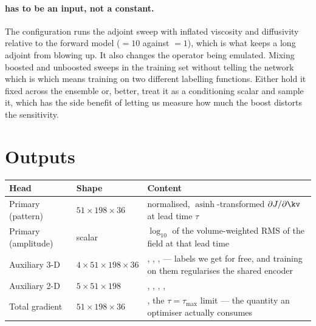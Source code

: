 \paragraph{ has to be an input, not a constant.}
The  configuration runs the adjoint sweep with inflated
viscosity and diffusivity relative to the forward model
(${}=10$ against ${}=1$), which is what
keeps a long adjoint from blowing up. It also changes the operator being
emulated. Mixing boosted and unboosted sweeps in the training set without
telling the network which is which means training on two different labelling
functions. Either hold it fixed across the ensemble or, better, treat it as a
conditioning scalar and sample it, which has the side benefit of letting us
measure how much the boost distorts the sensitivity.

\section{Outputs}

\begin{center}
\begin{tabularx}{\textwidth}{@{}Y{0.65}Y{0.7}Y{1.65}@{}}
\toprule
\textbf{Head} & \textbf{Shape} & \textbf{Content}\\
\midrule
Primary (pattern) & $51\times198\times36$
  & normalised, $\operatorname{asinh}$-transformed
    $\partial J/\partial\kv$ at lead time $\tau$\\
Primary (amplitude) & scalar
  & $\log_{10}$ of the volume-weighted RMS of the field at that lead time\\
Auxiliary 3-D & $4\times51\times198\times36$
  & , , ,  --- labels
    we get for free, and training on them regularises the shared encoder\\
Auxiliary 2-D & $5\times51\times198$
  & , , , ,
    \\
Total gradient & $51\times198\times36$
  & , the $\tau=\tau_{\max}$ limit --- the quantity an
    optimiser actually consumes\\
\bottomrule
\end{tabularx}
\end{center}

